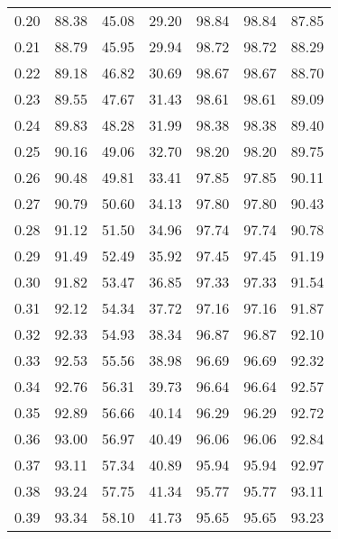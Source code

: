 \begin{tabular}{|c|c|c|c|c|c|c|}
      0.20 &     88.38 &     45.08 &      29.20 &   98.84 &      98.84 &         87.85 \\
      0.21 &     88.79 &     45.95 &      29.94 &   98.72 &      98.72 &         88.29 \\
      0.22 &     89.18 &     46.82 &      30.69 &   98.67 &      98.67 &         88.70 \\
      0.23 &     89.55 &     47.67 &      31.43 &   98.61 &      98.61 &         89.09 \\
      0.24 &     89.83 &     48.28 &      31.99 &   98.38 &      98.38 &         89.40 \\
      0.25 &     90.16 &     49.06 &      32.70 &   98.20 &      98.20 &         89.75 \\
      0.26 &     90.48 &     49.81 &      33.41 &   97.85 &      97.85 &         90.11 \\
      0.27 &     90.79 &     50.60 &      34.13 &   97.80 &      97.80 &         90.43 \\
      0.28 &     91.12 &     51.50 &      34.96 &   97.74 &      97.74 &         90.78 \\
      0.29 &     91.49 &     52.49 &      35.92 &   97.45 &      97.45 &         91.19 \\
      0.30 &     91.82 &     53.47 &      36.85 &   97.33 &      97.33 &         91.54 \\
      0.31 &     92.12 &     54.34 &      37.72 &   97.16 &      97.16 &         91.87 \\
      0.32 &     92.33 &     54.93 &      38.34 &   96.87 &      96.87 &         92.10 \\
      0.33 &     92.53 &     55.56 &      38.98 &   96.69 &      96.69 &         92.32 \\
      0.34 &     92.76 &     56.31 &      39.73 &   96.64 &      96.64 &         92.57 \\
      0.35 &     92.89 &     56.66 &      40.14 &   96.29 &      96.29 &         92.72 \\
      0.36 &     93.00 &     56.97 &      40.49 &   96.06 &      96.06 &         92.84 \\
      0.37 &     93.11 &     57.34 &      40.89 &   95.94 &      95.94 &         92.97 \\
      0.38 &     93.24 &     57.75 &      41.34 &   95.77 &      95.77 &         93.11 \\
      0.39 &     93.34 &     58.10 &      41.73 &   95.65 &      95.65 &         93.23 \\

\end{tabular}
